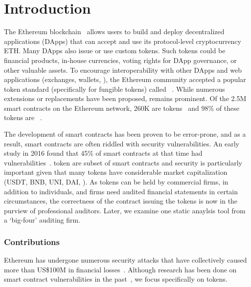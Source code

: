 
\section{Introduction}\label{sect:introduction}
The Ethereum blockchain~\cite{EthGit,EIP150} allows users to build and deploy decentralized applications (DApps) that can accept and use its protocol-level cryptocurrency ETH. Many DApps also issue or use custom tokens. Such tokens could be financial products, in-house currencies, voting rights for DApp governance, or other valuable assets. To encourage interoperability with other DApps and web applications (exchanges, wallets, \etc), the Ethereum community accepted a popular token standard (specifically for fungible tokens) called \erc~\cite{ERC20Std}. While numerous \erc extensions or replacements have been proposed, \erc remains prominent. Of the 2.5M~\cite{Alethio} smart contracts on the Ethereum network, 260K are tokens~\cite{TokenTracker} and 98\% of these tokens are \erc~\cite{EtherScan}. 

The development of smart contracts has been proven to be error-prone, and as a result, smart contracts are often riddled with security vulnerabilities. An early study in 2016 found that 45\% of smart contracts at that time had vulnerabilities~\cite{MakSm}. \erc token are subset of smart contracts and security is particularly important given that many tokens have considerable market capitalization (\eg USDT, BNB, UNI, DAI, \etc). As tokens can be held by commercial firms, in addition to individuals, and firms need audited financial statements in certain circumstances, the correctness of the contract issuing the tokens is now in the purview of professional auditors. Later, we examine one static anaylsis tool from a `big-four' auditing firm.

\subsubsection*{Contributions} Ethereum has undergone numerous security attacks that have collectively caused more than US\$100M in financial losses~\cite{DAO1,PeckShield,PartiyMultiSig,MyEthWallet,ParityFirstHack,ParitySecondHack}. Although research has been done on smart contract vulnerabilities in the past~\cite{EthSecServ}, we focus specifically on \erc tokens. 

